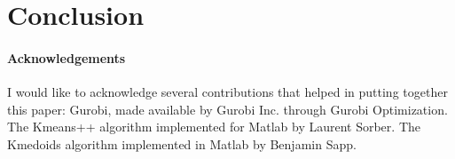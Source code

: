 \section{Conclusion}
\paragraph{Acknowledgements}
I would like to acknowledge several contributions that helped in putting together this paper: Gurobi, made available by Gurobi Inc. through Gurobi Optimization. The Kmeans++ algorithm implemented for Matlab by Laurent Sorber. The Kmedoids algorithm implemented in Matlab by Benjamin Sapp.
